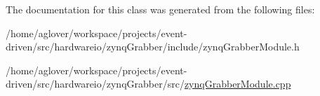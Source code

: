 The documentation for this class was generated from the following files\+:\begin{DoxyCompactItemize}
\item 
/home/aglover/workspace/projects/event-\/driven/src/hardwareio/zynq\+Grabber/include/zynq\+Grabber\+Module.\+h\item 
/home/aglover/workspace/projects/event-\/driven/src/hardwareio/zynq\+Grabber/src/\hyperlink{zynqGrabberModule_8cpp}{zynq\+Grabber\+Module.\+cpp}\end{DoxyCompactItemize}
